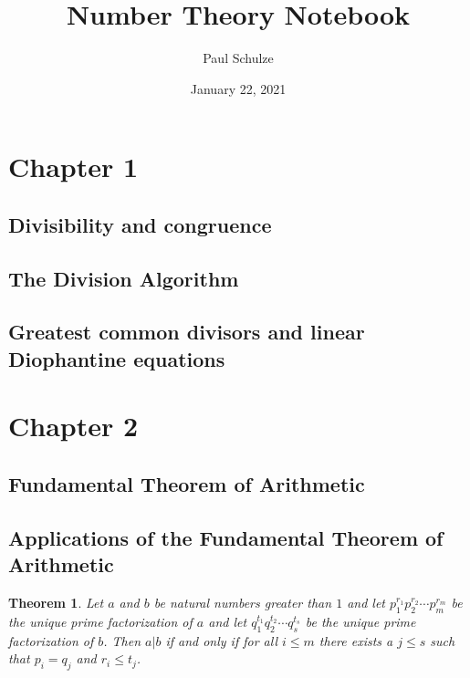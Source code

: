\documentclass{article}
\title{Number Theory Notebook}
\author{Paul Schulze}
\date{January 22, 2021}
\newtheorem{thm}{Theorem}[section]
\numberwithin{equation}{thm}
\begin{document}
\maketitle



\section{Chapter 1}

\subsection*{Divisibility and congruence}




\subsection*{The Division Algorithm}




\subsection*{Greatest common divisors and linear Diophantine equations}





\pagebreak



\section{Chapter 2}

\subsection*{Fundamental Theorem of Arithmetic}




\subsection*{Applications of the Fundamental Theorem of Arithmetic}

\begin{thm} \label{2.12}
  Let $a$ and $b$ be natural numbers greater than $1$ and let $p_1^{r_1} p_2^{r_2} \cdots p_m^{r_m}$ be the unique prime factorization of $a$ and let $q_1^{t_1} q_2^{t_2} \cdots q_s^{t_s}$ be the unique prime factorization of $b$. Then $a | b$ if and only if for all $i \leq m$ there exists a $j \leq s$ such that $p_i = q_j$ and $r_i \leq t_j$.
\end{thm}
\end{document}
